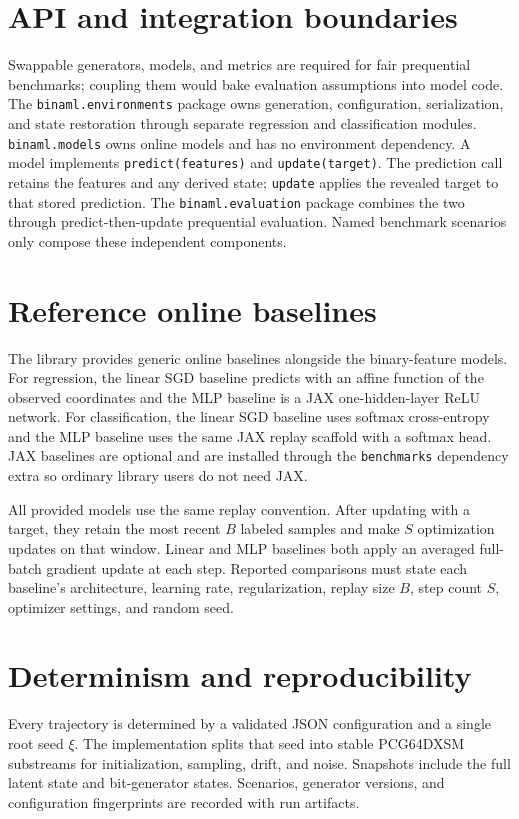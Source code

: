 \documentclass[11pt]{article}
\begin{document}
\section{API and integration boundaries}
Swappable generators, models, and metrics are required for fair prequential
benchmarks; coupling them would bake evaluation assumptions into model code.
The \texttt{binaml.environments} package owns generation, configuration,
serialization, and state restoration through separate regression and
classification modules.  \texttt{binaml.models} owns online models and has no
environment dependency.  A model implements
\texttt{predict(features)} and \texttt{update(target)}.  The
prediction call retains the features and any derived state;
\texttt{update} applies the revealed target to that stored prediction.
The \texttt{binaml.evaluation}
package combines the two through predict-then-update prequential evaluation.
Named benchmark scenarios only compose these
independent components.

\section{Reference online baselines}
The library provides generic online baselines alongside the binary-feature
models.  For regression, the linear SGD baseline predicts with an affine
function of the observed coordinates and the MLP baseline is a JAX
one-hidden-layer ReLU network.  For classification, the
linear SGD baseline uses softmax cross-entropy and
the MLP baseline uses the same JAX replay scaffold with a softmax head.
JAX baselines are optional and are installed through the \texttt{benchmarks}
dependency extra so ordinary library users do not need JAX.

All provided models use the same replay convention.  After updating with a target,
they retain the most recent $B$ labeled samples and make $S$ optimization
updates on that window.  Linear and MLP baselines both apply an averaged
full-batch gradient update at each step.  Reported comparisons must state each
baseline's architecture, learning rate, regularization, replay size $B$, step
count $S$, optimizer settings, and random seed.

\section{Determinism and reproducibility}
Every trajectory is determined by a validated JSON configuration and a single
root seed $\xi$.  The implementation splits that seed into stable PCG64DXSM
substreams for initialization, sampling, drift, and noise.  Snapshots include
the full latent state and bit-generator states.  Scenarios, generator versions,
and configuration fingerprints are recorded with run artifacts.
\end{document}
